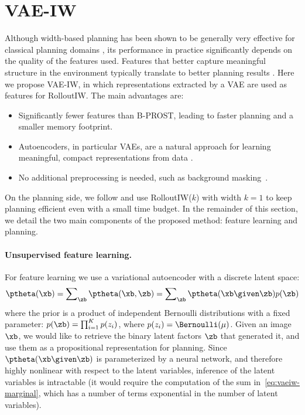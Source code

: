 \section{VAE-IW}

Although width-based planning has been shown to be generally very effective for classical planning domains \cite{iworginal,BFSW,ijcai2017-600}, its performance in practice significantly depends on the quality of the features used. Features that better capture meaningful structure in the environment typically translate to better planning results \cite{RLIW}. 
Here we propose VAE-IW, in which representations extracted by a VAE are used as features for RolloutIW. 
The main advantages are:
\begin{itemize}
    \item Significantly fewer features than B-PROST, leading to faster planning and a smaller memory footprint.
    \item Autoencoders, in particular VAEs, are a natural approach for learning meaningful, compact representations from data \cite{bengio2013representation,tschannen2018recent,kingma2019introduction}.
    \item No additional preprocessing is needed, such as background masking~\cite{rolloutiw-orginal}.
\end{itemize}
On the planning side, we follow \citet{RLIW} and use RolloutIW($k$) with width $k=1$ to keep planning efficient even with a small time budget.
In the remainder of this section, we detail the two main components of the proposed method: feature learning and planning.

\paragraph{Unsupervised feature learning.}

For feature learning we use a variational autoencoder with a discrete latent space:
\begin{equation}
    \ptheta(\xb) = \sum\nolimits_{\zb} \ptheta(\xb, \zb) = \sum\nolimits_{\zb} \ptheta(\xb \given \zb) p(\zb)
\label{eq:vaeiw-marginal}
\end{equation}
where the prior is a product of independent Bernoulli distributions with a fixed parameter:
    $p(\zb) = \prod_{i=1}^K p(z_i)$, where $ p(z_i) = \Bernoulli(\mu)$.
Given an image $\xb$, we would like to retrieve the binary latent factors $\zb$ that generated it, and use them as a propositional representation for planning. Since $\ptheta(\xb \given \zb)$ is parameterized by a neural network, and therefore highly nonlinear with respect to the latent variables, inference of the latent variables is intractable (it would require the computation of the sum in~\eqref{eq:vaeiw-marginal}, which has a number of terms exponential in the number of latent variables).

